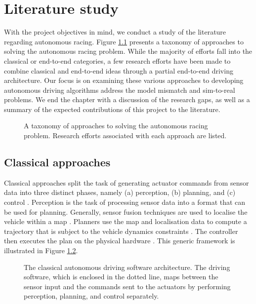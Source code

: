\chapter{Literature study}
\label{chp:litreview}

With the project objectives in mind, we conduct a study of the literature regarding autonomous racing.
Figure \ref{fig:lit_tax_sec} presents a taxonomy of approaches to solving the autonomous racing problem.
While the majority of efforts fall into the classical or end-to-end categories, a few research efforts have been made to combine classical and end-to-end ideas through a partial end-to-end driving architecture.
Our focus is on examining these various approaches to developing autonomous driving algorithms address the model mismatch and sim-to-real problems.
We end the chapter with a discussion of the research gaps, as well as a summary of the expected contributions of this project to the literature.

\begin{figure}[htb!]
    \centering
    
    \caption[A taxonomy of the autonomous racing literature]{A taxonomy of approaches to solving the autonomous racing problem. Research efforts associated with each approach are listed.}
    \label{fig:lit_tax_sec}
\end{figure}


\section{Classical approaches}\label{sec:classic}


Classical approaches split the task of generating actuator commands from sensor data into three distinct phases, namely (a) perception, (b) planning, and (c) control \cite{Betz2021}.
Perception is the task of processing sensor data into a format that can be used for planning. 
Generally, sensor fusion techniques are used to localise the vehicle within a map \cite{Gotlib2019, Wischnewski2019}.
Planners use the map and localisation data to compute a trajectory that is subject to the vehicle dynamics constraints \cite{Liniger2015a}.
The controller then executes the plan on the physical hardware \cite{Kritayakirana2012}.
This generic framework is illustrated in Figure \ref{fig:full_stack}.

\begin{figure}[h]
    \centering
    
    \caption[The classical autonomous driving architecture]{The classical autonomous driving software architecture. The driving software, which is enclosed in the dotted line, maps between the sensor input and the commands sent to the actuators by performing perception, planning, and control separately.}
    \label{fig:full_stack}
\end{figure}

